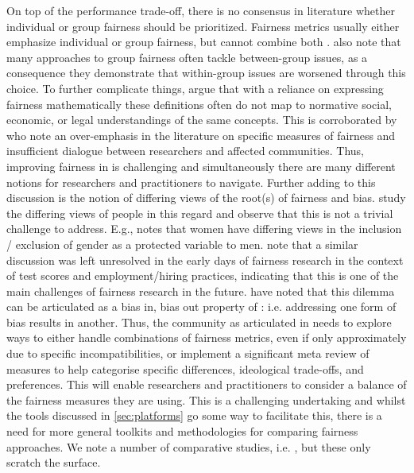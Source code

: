 \label{sec:balance}
On top of the performance trade-off, there is no consensus in literature whether individual or group fairness should be prioritized. Fairness metrics usually either emphasize individual or group fairness, but cannot combine both  .  also note that many approaches to group fairness often tackle between-group issues, as a consequence they demonstrate that within-group issues are worsened through this choice. To further complicate things,  argue that with a reliance on expressing fairness mathematically these definitions often do not map to normative social, economic, or legal understandings of the same concepts. This is corroborated by  who note an over-emphasis in the literature on specific measures of fairness and insufficient dialogue between researchers and affected communities. Thus, improving fairness in \ml is challenging and simultaneously there are many different notions for researchers and practitioners to navigate. Further adding to this discussion is the notion of differing views of the root(s) of fairness and bias.  study the differing views of people in this regard and observe that this is not a trivial challenge to address. E.g.,  notes that women have differing views in the inclusion / exclusion of gender as a protected variable to men.  note that a similar discussion was left unresolved in the early days of fairness research in the context of test scores and employment/hiring practices, indicating that this is one of the main challenges of \ml fairness research in the future.  have noted that this dilemma can be articulated as a bias in, bias out property of \ml: i.e. addressing one form of bias results in another. 
Thus, the community as articulated in  needs to explore ways to either handle combinations of fairness metrics, even if only approximately due to specific incompatibilities, or implement a significant meta review of measures to help categorise specific differences, ideological trade-offs, and preferences. This will enable researchers and practitioners to consider a balance of the fairness measures they are using. This is a challenging undertaking and whilst the tools discussed in \autoref{sec:platforms} go some way to facilitate this, there is a need for more general toolkits and methodologies for comparing fairness approaches. We note a number of comparative studies, i.e. , but these only scratch the surface.

